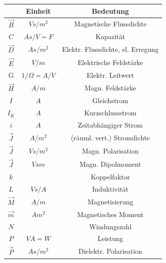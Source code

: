 \documentclass[a4paper, 6pt, landscape]{scrartcl}
\begin{document}
\begin{multicols*}{4}
	\vspace{-0.1cm}
	\begin{tabular}{|c|c|c|}
		\hline
		\textbf{}       & \textbf{Einheit} & \textbf{Bedeutung}                 \\
		\hline
		$\vec{B}$       & $Vs/m^2$         & Magnetische Flussdichte            \\
		\hline
		$C$             & $As/V=F$         & Kapazität                         \\
		\hline
		$\vec{D}$       & $As/m^2$         & Elektr. Flussdichte, el. Erregung  \\
		\hline
		$\vec{E}$       & $V/m$            & Elektrische Feldstärke            \\
		\hline
		G               & $1/\Omega=A/V$   & Elektr. Leitwert                   \\
		\hline
		$\vec{H}$       & $A/m$            & Magn. Feldstärke                  \\
		\hline
		$I$             & $A$              & Gleichstrom                        \\
		\hline
		$I_K$           & $A$              & Kurzschlussstrom                   \\
		\hline
		$i$             & $A$              & Zeitabhängiger Strom              \\
		\hline
		$\vec{J}$       & $A/m^2$          & (räuml. vert.) Stromdichte        \\
		\hline
		$\vec{J}$       & $Vs/m^2$         & Magn. Polarisation                 \\
		\hline
		$\vec{J}$       & $Vsm$            & Magn. Dipolmoment                  \\
		\hline
		$k$             &                  & Koppelfaktor                       \\
		\hline
		$L$             & $Vs/A$           & Induktivität                      \\
		\hline
		$\vec{M}$       & $A/m$            & Magnetisierung                     \\
		\hline
		$\vec{m}$       & $Am^2$           & Magnetisches Moment                \\
		\hline
		$N$             &                  & Windungszahl                       \\
		\hline
		$P$             & $VA=W$           & Leistung                           \\
		\hline
		$\vec{P}$       & $As/m^2$         & Dielektr. Polarisation             \\

\end{tabular}
\end{multicols*}
\end{document}
